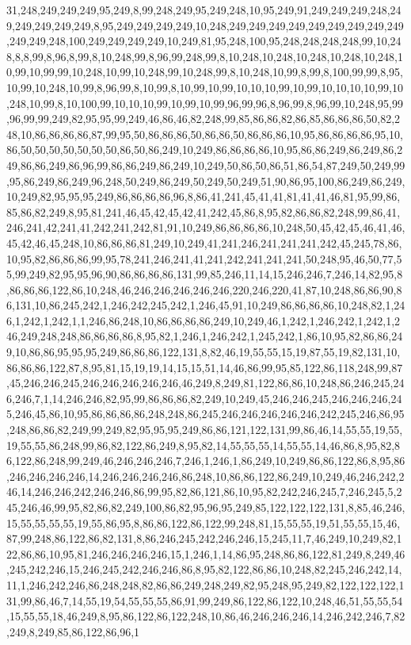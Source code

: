 31,248,249,249,249,95,249,8,99,248,249,95,249,248,10,95,249,91,249,249,249,248,249,249,249,249,249,8,95,249,249,249,249,10,248,249,249,249,249,249,249,249,249,249,249,249,248,100,249,249,249,249,10,249,81,95,248,100,95,248,248,248,248,99,10,248,8,8,99,8,96,8,99,8,10,248,99,8,96,99,248,99,8,10,248,10,248,10,248,10,248,10,248,10,99,10,99,99,10,248,10,99,10,248,99,10,248,99,8,10,248,10,99,8,99,8,100,99,99,8,95,10,99,10,248,10,99,8,96,99,8,10,99,8,10,99,10,99,10,10,10,99,10,99,10,10,10,10,99,10,248,10,99,8,10,100,99,10,10,10,99,10,99,10,99,96,99,96,8,96,99,8,96,99,10,248,95,99,96,99,99,249,82,95,95,99,249,46,86,46,82,248,99,85,86,86,82,86,85,86,86,86,50,82,248,10,86,86,86,86,87,99,95,50,86,86,86,50,86,86,50,86,86,86,10,95,86,86,86,86,95,10,86,50,50,50,50,50,50,50,86,50,86,249,10,249,86,86,86,86,10,95,86,86,249,86,249,86,249,86,86,249,86,96,99,86,86,249,86,249,10,249,50,86,50,86,51,86,54,87,249,50,249,99,95,86,249,86,249,96,248,50,249,86,249,50,249,50,249,51,90,86,95,100,86,249,86,249,10,249,82,95,95,95,249,86,86,86,86,96,8,86,41,241,45,41,41,81,41,41,46,81,95,99,86,85,86,82,249,8,95,81,241,46,45,42,45,42,41,242,45,86,8,95,82,86,86,82,248,99,86,41,246,241,42,241,41,242,241,242,81,91,10,249,86,86,86,86,10,248,50,45,42,45,46,41,46,45,42,46,45,248,10,86,86,86,81,249,10,249,41,241,246,241,241,241,242,45,245,78,86,10,95,82,86,86,86,99,95,78,241,246,241,41,241,242,241,241,241,50,248,95,46,50,77,55,99,249,82,95,95,96,90,86,86,86,86,131,99,85,246,11,14,15,246,246,7,246,14,82,95,8,86,86,86,122,86,10,248,46,246,246,246,246,246,220,246,220,41,87,10,248,86,86,90,86,131,10,86,245,242,1,246,242,245,242,1,246,45,91,10,249,86,86,86,86,10,248,82,1,246,1,242,1,242,1,1,246,86,248,10,86,86,86,86,249,10,249,46,1,242,1,246,242,1,242,1,246,249,248,248,86,86,86,86,8,95,82,1,246,1,246,242,1,245,242,1,86,10,95,82,86,86,249,10,86,86,95,95,95,249,86,86,86,122,131,8,82,46,19,55,55,15,19,87,55,19,82,131,10,86,86,86,122,87,8,95,81,15,19,19,14,15,15,51,14,46,86,99,95,85,122,86,118,248,99,87,45,246,246,245,246,246,246,246,246,46,249,8,249,81,122,86,86,10,248,86,246,245,246,246,7,1,14,246,246,82,95,99,86,86,86,82,249,10,249,45,246,246,245,246,246,246,245,246,45,86,10,95,86,86,86,86,248,248,86,245,246,246,246,246,246,242,245,246,86,95,248,86,86,82,249,99,249,82,95,95,95,249,86,86,121,122,131,99,86,46,14,55,55,19,55,19,55,55,86,248,99,86,82,122,86,249,8,95,82,14,55,55,55,14,55,55,14,46,86,8,95,82,86,122,86,248,99,249,46,246,246,246,7,246,1,246,1,86,249,10,249,86,86,122,86,8,95,86,246,246,246,246,14,246,246,246,246,86,248,10,86,86,122,86,249,10,249,46,246,242,246,14,246,246,242,246,246,86,99,95,82,86,121,86,10,95,82,242,246,245,7,246,245,5,245,246,46,99,95,82,86,82,249,100,86,82,95,96,95,249,85,122,122,122,131,8,85,46,246,15,55,55,55,55,19,55,86,95,8,86,86,122,86,122,99,248,81,15,55,55,19,51,55,55,15,46,87,99,248,86,122,86,82,131,8,86,246,245,242,246,246,15,245,11,7,46,249,10,249,82,122,86,86,10,95,81,246,246,246,246,15,1,246,1,14,86,95,248,86,86,122,81,249,8,249,46,245,242,246,15,246,245,242,246,246,86,8,95,82,122,86,86,10,248,82,245,246,242,14,11,1,246,242,246,86,248,248,82,86,86,249,248,249,82,95,248,95,249,82,122,122,122,131,99,86,46,7,14,55,19,54,55,55,55,86,91,99,249,86,122,86,122,10,248,46,51,55,55,54,15,55,55,18,46,249,8,95,86,122,86,122,248,10,86,46,246,246,246,14,246,242,246,7,82,249,8,249,85,86,122,86,96,1